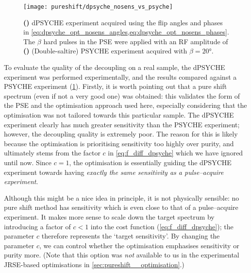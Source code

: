 \begin{figure}[htb]
    \centering
    \texttt{[image: pureshift/dpsyche\_nosens\_vs\_psyche]}%
    {\label{fig:dpsyche_nosens_vs_psyche_dp}}%
    {\label{fig:dpsyche_nosens_vs_psyche_p}}%
    \caption[Comparison of optimised dPSYCHE and PSYCHE]{
        \textbf{()} dPSYCHE experiment acquired using the flip angles and phases in \cref{eq:dpsyche_opt_nosens_angles,eq:dpsyche_opt_nosens_phases}.
        The $\beta$ hard pulses in the PSE were applied with an RF amplitude of 
        \textbf{()} (Double-saltire) PSYCHE experiment acquired with $\beta = \ang{20}$.
    }
    \label{fig:dpsyche_nosens_vs_psyche}
\end{figure}

To evaluate the quality of the decoupling on a real sample, the dPSYCHE experiment was performed experimentally, and the results compared against a PSYCHE experiment (\cref{fig:dpsyche_nosens_vs_psyche}).
Firstly, it is worth pointing out that a pure shift spectrum (even if not a very good one) was obtained: this validates the form of the PSE and the optimisation approach used here, especially considering that the optimisation was not tailored towards this particular sample.
The dPSYCHE experiment clearly has much greater sensitivity than the PSYCHE experiment; however, the decoupling quality is extremely poor.
The reason for this is likely because the optimisation is prioritising sensitivity too highly over purity, and ultimately stems from the factor $c$ in \cref{eq:f_diff_dpsyche} which we have ignored until now.
Since $c = 1$, the optimisation is essentially guiding the dPSYCHE experiment towards having \textit{exactly the same sensitivity as a pulse--acquire experiment}.

Although this might be a nice idea in principle, it is not physically sensible: no pure shift method has sensitivity which is even close to that of a pulse--acquire experiment.
It makes more sense to scale down the target spectrum by introducing a factor of $c < 1$ into the cost function (\cref{eq:f_diff_dpsyche}); the parameter $c$ therefore represents the `target sensitivity'.
By changing the parameter $c$, we can control whether the optimisation emphasises sensitivity or purity more.
(Note that this option was \textit{not} available to us in the experimental JRSE-based optimisations in \cref{sec:pureshift__optimisation}.)

